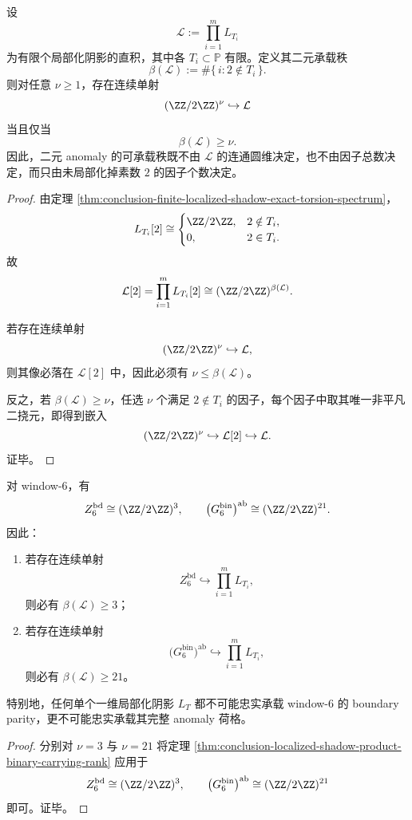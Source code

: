 \begin{theorem}\label{thm:conclusion-localized-shadow-product-binary-carrying-rank}
设
\[
\mathcal L:=\prod_{i=1}^{m}L_{T_i}
\]
为有限个局部化阴影的直积，其中各 \(T_i\subset\mathbb P\) 有限。定义其二元承载秩
\[
\beta(\mathcal L):=\#\{\,i:2\notin T_i\,\}.
\]
则对任意 \(\nu\ge 1\)，存在连续单射
\[
(\ZZ/2\ZZ)^\nu \hookrightarrow \mathcal L
\]
当且仅当
\[
\beta(\mathcal L)\ge \nu.
\]
因此，二元 anomaly 的可承载秩既不由 \(\mathcal L\) 的连通圆维决定，也不由因子总数决定，而只由未局部化掉素数 \(2\) 的因子个数决定。
\end{theorem}
\begin{proof}
由定理 \ref{thm:conclusion-finite-localized-shadow-exact-torsion-spectrum}，
\[
L_{T_i}[2]\cong
\begin{cases}
\ZZ/2\ZZ,& 2\notin T_i,\\
0,& 2\in T_i.
\end{cases}
\]
故
\[
\mathcal L[2]=\prod_{i=1}^{m}L_{T_i}[2]\cong (\ZZ/2\ZZ)^{\beta(\mathcal L)}.
\]

若存在连续单射
\[
(\ZZ/2\ZZ)^\nu \hookrightarrow \mathcal L,
\]
则其像必落在 \(\mathcal L[2]\) 中，因此必须有 \(\nu\le \beta(\mathcal L)\)。

反之，若 \(\beta(\mathcal L)\ge \nu\)，任选 \(\nu\) 个满足 \(2\notin T_i\) 的因子，每个因子中取其唯一非平凡二挠元，即得到嵌入
\[
(\ZZ/2\ZZ)^\nu\hookrightarrow \mathcal L[2]\hookrightarrow \mathcal L.
\]
证毕。
\end{proof}

\begin{corollary}\label{cor:conclusion-window6-localized-shadow-minimal-binary-carrying-number}
对 window-\(6\)，有
\[
Z_6^{\mathrm{bd}}\cong (\ZZ/2\ZZ)^3,
\qquad
\bigl(G_6^{\mathrm{bin}}\bigr)^{\mathrm{ab}}\cong (\ZZ/2\ZZ)^{21}.
\]
因此：
\begin{enumerate}
  \item 若存在连续单射
  \[
  Z_6^{\mathrm{bd}}\hookrightarrow \prod_{i=1}^{m}L_{T_i},
  \]
  则必有 \(\beta(\mathcal L)\ge 3\)；
  \item 若存在连续单射
  \[
  \bigl(G_6^{\mathrm{bin}}\bigr)^{\mathrm{ab}}\hookrightarrow \prod_{i=1}^{m}L_{T_i},
  \]
  则必有 \(\beta(\mathcal L)\ge 21\)。
\end{enumerate}
特别地，任何单个一维局部化阴影 \(L_T\) 都不可能忠实承载 window-\(6\) 的 boundary parity，更不可能忠实承载其完整 anomaly 荷格。
\end{corollary}
\begin{proof}
分别对 \(\nu=3\) 与 \(\nu=21\) 将定理 \ref{thm:conclusion-localized-shadow-product-binary-carrying-rank} 应用于
\[
Z_6^{\mathrm{bd}}\cong (\ZZ/2\ZZ)^3,
\qquad
\bigl(G_6^{\mathrm{bin}}\bigr)^{\mathrm{ab}}\cong (\ZZ/2\ZZ)^{21}
\]
即可。证毕。
\end{proof}

